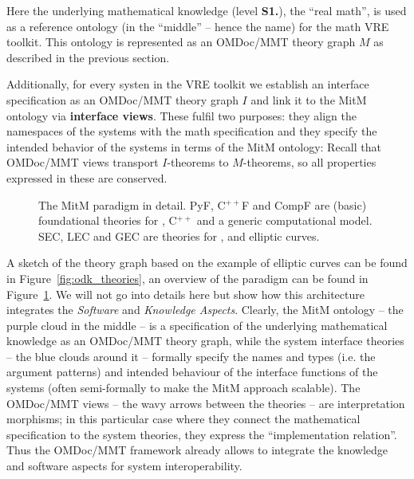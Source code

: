 Here the underlying mathematical knowledge (level \textbf{S1.}), the ``real math'', is
used as a reference ontology (in the ``middle'' -- hence the name) for the math VRE
toolkit. This ontology is represented as an OMDoc/MMT theory graph $M$ as described in the
previous section.

Additionally, for every systen in the \pn VRE toolkit we establish an interface
specification as an OMDoc/MMT theory graph $I$ and link it to the MitM ontology via
\textbf{interface views}. These fulfil two purposes: they align the namespaces of the
systems with the math specification and they specify the intended behavior of the systems
in terms of the MitM ontology: Recall that OMDoc/MMT views transport $I$-theorems to
$M$-theorems, so all properties expressed in these are conserved.

\begin{figure}[ht]\centering
  \def\myxscale{3}\def\myyscale{1.2}
  
  \caption{The MitM paradigm in detail. PyF, C${}^{++}$F and CompF are (basic)
    foundational theories for \python, C${}^{++}$ and a generic computational model. SEC,
    LEC and GEC are theories for \SageMath, \LMFDB and \GAP elliptic curves.}\label{fig:mitm}
\end{figure}

A sketch of the theory graph based on the example of elliptic curves can be
found in Figure~\ref{fig:odk_theories}, an overview of the paradigm can be found
in Figure~\ref{fig:mitm}.  We will not go into details here but show how this
architecture integrates the \emph{Software} and \emph{Knowledge Aspects}.
Clearly, the MitM ontology -- the purple cloud in the middle -- is a
specification of the underlying mathematical knowledge as an OMDoc/MMT theory
graph, while the system interface theories -- the blue clouds around it --
formally specify the names and types (i.e. the argument patterns) and intended
behaviour of the interface functions of the systems (often semi-formally to make
the MitM approach scalable). The OMDoc/MMT views -- the wavy arrows between the
theories -- are interpretation morphisms; in this particular case where they
connect the mathematical specification to the system theories, they express the
``implementation relation''. Thus the OMDoc/MMT framework already allows to
integrate the knowledge and software aspects for system interoperability.

